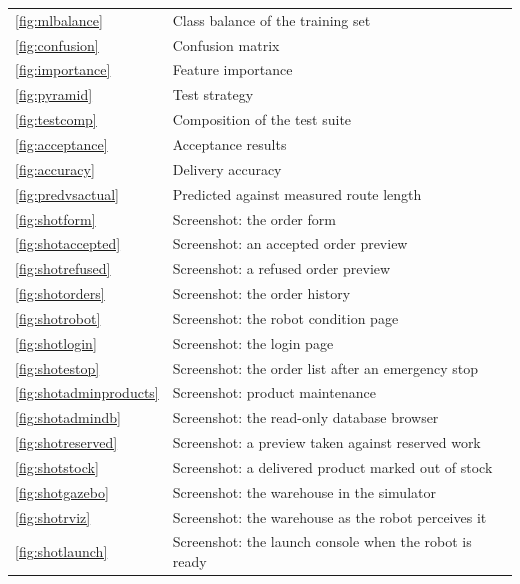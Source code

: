 \documentclass[12pt,a4paper]{report}
\begin{document}
\begin{longtable}{@{}p{}p{}@{}}
\ref{fig:mlbalance} & Class balance of the training set \\
\ref{fig:confusion} & Confusion matrix \\
\ref{fig:importance} & Feature importance \\
\ref{fig:pyramid} & Test strategy \\
\ref{fig:testcomp} & Composition of the test suite \\
\ref{fig:acceptance} & Acceptance results \\
\ref{fig:accuracy} & Delivery accuracy \\
\ref{fig:predvsactual} & Predicted against measured route length \\
\ref{fig:shotform} & Screenshot: the order form \\
\ref{fig:shotaccepted} & Screenshot: an accepted order preview \\
\ref{fig:shotrefused} & Screenshot: a refused order preview \\
\ref{fig:shotorders} & Screenshot: the order history \\
\ref{fig:shotrobot} & Screenshot: the robot condition page \\
\ref{fig:shotlogin} & Screenshot: the login page \\
\ref{fig:shotestop} & Screenshot: the order list after an emergency stop \\
\ref{fig:shotadminproducts} & Screenshot: product maintenance \\
\ref{fig:shotadmindb} & Screenshot: the read-only database browser \\
\ref{fig:shotreserved} & Screenshot: a preview taken against reserved work \\
\ref{fig:shotstock} & Screenshot: a delivered product marked out of stock \\
\ref{fig:shotgazebo} & Screenshot: the warehouse in the simulator \\
\ref{fig:shotrviz} & Screenshot: the warehouse as the robot perceives it \\
\ref{fig:shotlaunch} & Screenshot: the launch console when the robot is ready \\
\bottomrule
\end{longtable}
\end{document}
